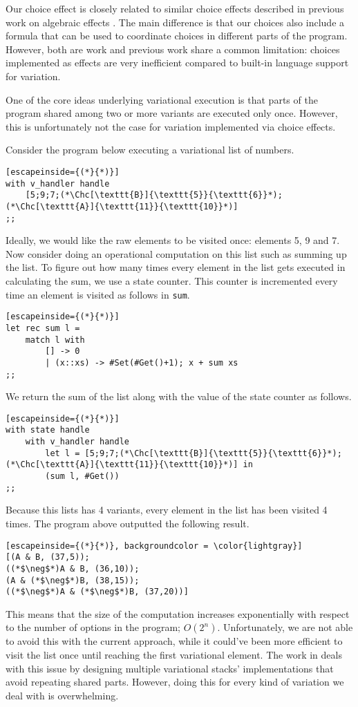 Our choice effect is closely related to similar choice effects described in previous work on algebraic effects \cite{BP15effects,Pretnar15,Kammar2013,Plotkin2001}. The main difference is that our choices also include a formula that can be used to coordinate choices in different parts of the program. However, both are work and previous work share a common limitation: choices implemented as effects are very inefficient compared to built-in language support for variation.

One of the core ideas underlying variational execution is that parts of the program shared among two or more variants are executed only once. However, this is unfortunately not the case for variation implemented via choice effects. 

Consider the program below executing a variational list of numbers. 
%
\begin{lstlisting}[escapeinside={(*}{*)}]
with v_handler handle
    [5;9;7;(*\Chc[\texttt{B}]{\texttt{5}}{\texttt{6}}*);(*\Chc[\texttt{A}]{\texttt{11}}{\texttt{10}}*)] 
;;
\end{lstlisting}
%
Ideally, we would like the raw elements to be visited once: elements 5, 9 and 7. Now consider doing an operational computation on this list such as summing up the list. To figure out how many times every element in the list gets executed in calculating the sum, we use a state counter. This counter is incremented every time an element is visited as follows in \texttt{sum}.     
%
\begin{lstlisting}[escapeinside={(*}{*)}]
let rec sum l = 
    match l with 
        [] -> 0
        | (x::xs) -> #Set(#Get()+1); x + sum xs
;;
\end{lstlisting}
%
We return the sum of the list along with the value of the state counter as follows.
%
\begin{lstlisting}[escapeinside={(*}{*)}]
with state handle
    with v_handler handle
        let l = [5;9;7;(*\Chc[\texttt{B}]{\texttt{5}}{\texttt{6}}*);(*\Chc[\texttt{A}]{\texttt{11}}{\texttt{10}}*)] in
        (sum l, #Get())
;;
\end{lstlisting}
%
Because this lists has 4 variants, every element in the list has been visited 4 times. The program above outputted the following result. 
%
\begin{lstlisting}[escapeinside={(*}{*)}, backgroundcolor = \color{lightgray}]
[(A & B, (37,5));
((*$\neg$*)A & B, (36,10));
(A & (*$\neg$*)B, (38,15));
((*$\neg$*)A & (*$\neg$*)B, (37,20))]
\end{lstlisting}
%
This means that the size of the computation increases exponentially with respect to the number of options in the program; $ O(2^n)$. Unfortunately, we are not able to avoid this with the current approach, while it could've been more efficient to visit the list once until reaching the first variational element. The work in \cite{MMWWK17vamos} deals with this issue by designing multiple variational stacks' implementations that avoid repeating shared parts. However, doing this for every kind of variation we deal with is overwhelming. 


